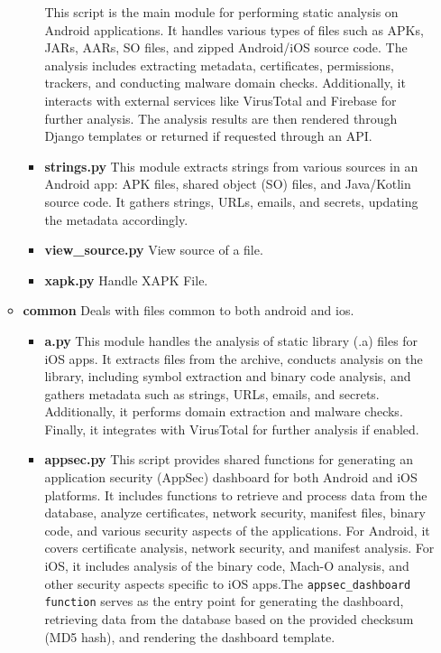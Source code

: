 \documentclass{report}
\begin{document}
\begin{itemize}
\begin{itemize}
\begin{itemize}
                    This script is the main module for performing static analysis on Android applications. It handles various types of files such as APKs, JARs, AARs, SO files, and zipped Android/iOS source code. The analysis includes extracting metadata, certificates, permissions, trackers, and conducting malware domain checks. Additionally, it interacts with external services like VirusTotal and Firebase for further analysis. The analysis results are then rendered through Django templates or returned if requested through an API.
                    \item \textbf{strings.py}
                    This module extracts strings from various sources in an Android app: APK files, shared object (SO) files, and Java/Kotlin source code. It gathers strings, URLs, emails, and secrets, updating the metadata accordingly.
                    \item \textbf{view\_source.py}
                    View source of a file.
                    \item \textbf{xapk.py}
                    Handle XAPK File.                                        
                \end{itemize}
            \item \textbf {common}
            \newline Deals with files common to both android and ios.
                \begin{itemize}
                    \item \textbf {a.py}
                    This module handles the analysis of static library (.a) files for iOS apps. It extracts files from the archive, conducts analysis on the library, including symbol extraction and binary code analysis, and gathers metadata such as strings, URLs, emails, and secrets. Additionally, it performs domain extraction and malware checks. Finally, it integrates with VirusTotal for further analysis if enabled.
                    \item \textbf{appsec.py}                    
                    This script provides shared functions for generating an application security (AppSec) dashboard for both Android and iOS platforms. It includes functions to retrieve and process data from the database, analyze certificates, network security, manifest files, binary code, and various security aspects of the applications. For Android, it covers certificate analysis, network security, and manifest analysis. For iOS, it includes analysis of the binary code, Mach-O analysis, and other security aspects specific to iOS apps.The \texttt{appsec\_dashboard function} serves as the entry point for generating the dashboard, retrieving data from the database based on the provided checksum (MD5 hash), and rendering the dashboard template.

\end{itemize}
\end{itemize}
\end{itemize}
\end{document}
